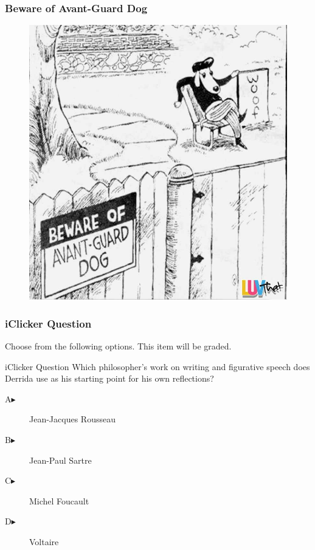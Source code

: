 \documentclass[xcolor=dvipsnames]{beamer}
\begin{document}
\begin{frame}
  \frametitle{Beware of Avant-Guard Dog}
  \begin{figure}[h]
    \includegraphics[scale=0.28]{./BewareTheAvantGuardDog.jpg}
  \end{figure}
\end{frame}

\begin{frame}
  \frametitle{iClicker Question}
Choose from the following options. This item will be graded.
\begin{block}{iClicker Question}
Which philosopher's work on writing and figurative speech does Derrida
use as his starting point for his own reflections?
\end{block}
\begin{description}
\item[A\hspace{.2in}$\blacktriangleright$] Jean-Jacques Rousseau
\item[B\hspace{.2in}$\blacktriangleright$] Jean-Paul Sartre
\item[C\hspace{.2in}$\blacktriangleright$] Michel Foucault
\item[D\hspace{.2in}$\blacktriangleright$] Voltaire
\end{description}
\end{frame}
\end{document}
